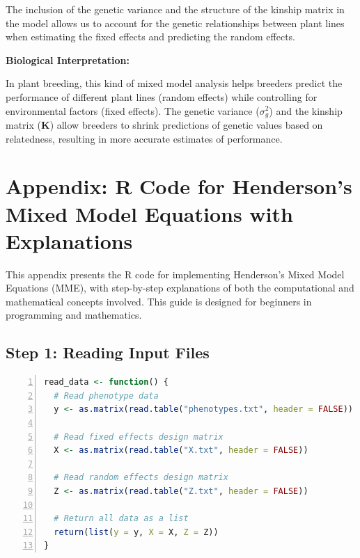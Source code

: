 \documentclass[12pt,a4paper]{article}
\newenvironment{interpretation}[1][]
{\begin{basebox}[linecolor=uqgreen]
\textbf{\color{uqgreen}Biological Interpretation:} \textit{#1}\par\noindent\ignorespaces}
{\end{basebox}}
\begin{document}
The inclusion of the genetic variance and the structure of the kinship matrix in the model allows us to account for the genetic relationships between plant lines when estimating the fixed effects and predicting the random effects.

\begin{interpretation}
In plant breeding, this kind of mixed model analysis helps breeders predict the performance of different plant lines (random effects) while controlling for environmental factors (fixed effects). The genetic variance ($\sigma^2_g$) and the kinship matrix ($\mathbf{K}$) allow breeders to shrink predictions of genetic values based on relatedness, resulting in more accurate estimates of performance.
\end{interpretation}


\section{Appendix: R Code for Henderson's Mixed Model Equations with Explanations}

This appendix presents the R code for implementing Henderson's Mixed Model Equations (MME), with step-by-step explanations of both the computational and mathematical concepts involved. This guide is designed for beginners in programming and mathematics.

\subsection{Step 1: Reading Input Files}

\begin{lstlisting}[language=R, 
                   caption=Step 2: Defining Variance Components,
                   basicstyle=\ttfamily\footnotesize,
                   keywordstyle=\color{blue},
                   stringstyle=\color{red},
                   commentstyle=\color{green!60!black},
                   numbers=left,
                   numberstyle=\tiny\color{gray},
                   frame=single,
                   breaklines=true,
                   linewidth=0.95\textwidth,
                   columns=flexible,
                   xleftmargin=0.05\textwidth,
                   xrightmargin=0.05\textwidth]
read_data <- function() {
  # Read phenotype data
  y <- as.matrix(read.table("phenotypes.txt", header = FALSE))
  
  # Read fixed effects design matrix
  X <- as.matrix(read.table("X.txt", header = FALSE))
  
  # Read random effects design matrix
  Z <- as.matrix(read.table("Z.txt", header = FALSE))
  
  # Return all data as a list
  return(list(y = y, X = X, Z = Z))
}
\end{lstlisting}
\end{document}
